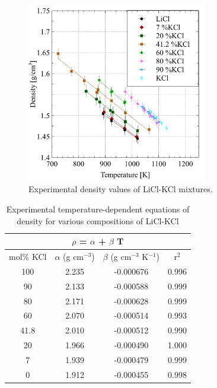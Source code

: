 \documentclass[review]{elsarticle}
\begin{document}
\begin{figure}[h]
 \centering
 \includegraphics[width=0.7\textwidth]{images/density_exp.jpg} 
 \caption{Experimental density values of LiCl-KCl mixtures.}
 \label{fig:density_exp}
\end{figure} 

\begin{table}[h]
\centering
\caption{Experimental temperature-dependent equations of density for various compositions of LiCl-KCl}
\begin{tabular}{|c|c|c|c|}
\hline
\multicolumn{4}{|c|}{$\rho$ = $\alpha$ + $\beta$ T} \\
\hline
mol\% KCl & $\alpha$ (g cm$^{-3}$) & $\beta$ (g cm$^{-3}$ K$^{-1}$) & r$^{2}$\\
\hline
100       & 2.235         & -0.000676        & 0.996 \\
90        & 2.133         & -0.000588        & 0.999 \\
80        & 2.171         & -0.000628        & 0.999 \\
60        & 2.070         & -0.000514        & 0.993 \\
41.8      & 2.010         & -0.000512        & 0.990 \\
20        & 1.966         & -0.000490        & 1.000 \\
7         & 1.939         & -0.000479        & 0.999 \\
0         & 1.912         & -0.000455        & 0.998 \\
\hline
\end{tabular}
\label{table1}
\end{table}
\end{document}
